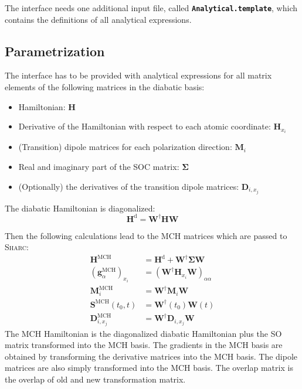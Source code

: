 \documentclass[a4paper,10pt,DIV=15,openany]{scrbook}
\newcommand{\sharc}{\textsc{Sharc}}
\newcommand{\ttt}[1]{\textbf{\texttt{#1}}}
\begin{document}
The interface needs one additional input file, called \ttt{Analytical.template}, which contains the definitions of all analytical expressions.

\subsection{Parametrization}

The interface has to be provided with analytical expressions for all matrix elements of the following matrices in the diabatic basis:
\begin{itemize}
  \item Hamiltonian: $\mathbf{H}$
  \item Derivative of the Hamiltonian with respect to each atomic coordinate: $\mathbf{H}_{x_i}$
  \item (Transition) dipole matrices for each polarization direction: $\mathbf{M}_i$
  \item Real and imaginary part of the SOC matrix: $\boldsymbol{\Sigma}$
  \item (Optionally) the derivatives of the transition dipole matrices: $\mathbf{D}_{i,x_j}$
\end{itemize}

The diabatic Hamiltonian is diagonalized:
\begin{equation}
  \mathbf{H}^{\text{d}}=\mathbf{W}^\dagger\mathbf{H}\mathbf{W}
\end{equation}


Then the following calculations lead to the MCH matrices which are passed to \sharc:
\begin{align}
  \mathbf{H}^{\text{MCH}}&=\mathbf{H}^{\text{d}}+\mathbf{W}^\dagger\boldsymbol{\Sigma}\mathbf{W}\\
  \left(\mathbf{g}^{\text{MCH}}_\alpha\right)_{x_i}&=\left(\mathbf{W}^\dagger\mathbf{H}_{x_i}\mathbf{W}\right)_{\alpha\alpha}\\
  \mathbf{M}^{\text{MCH}}_i&=\mathbf{W}^\dagger\mathbf{M}_i\mathbf{W}\\
  \mathbf{S}^{\text{MCH}}(t_0,t)&=\mathbf{W}^\dagger(t_0)\mathbf{W}(t)\\
  \mathbf{D}^{\text{MCH}}_{i,x_j}&=\mathbf{W}^\dagger\mathbf{D}_{i,x_j}\mathbf{W}
\end{align}
The MCH Hamiltonian is the diagonalized diabatic Hamiltonian plus the SO matrix transformed into the MCH basis. The gradients in the MCH basis are obtained by transforming the derivative matrices into the MCH basis. The dipole matrices are also simply transformed into the MCH basis. The overlap matrix is the overlap of old and new transformation matrix.
\end{document}
